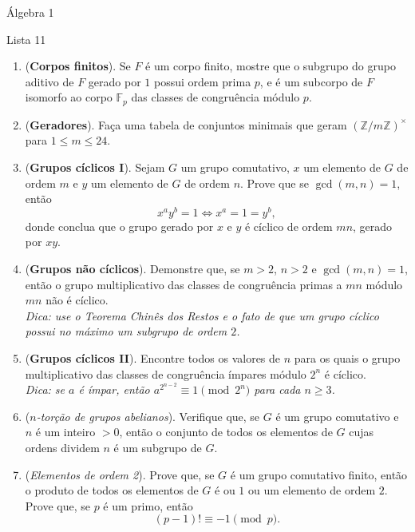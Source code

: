 \documentclass[a4paper,12pt]{article}
\begin{document}
\begin{center}
    \large Álgebra 1
\end{center}

\begin{center}
    \large Lista 11
\end{center}
  
\begin{enumerate}[label=11.\arabic*.]

    \item (\textbf{Corpos finitos}). Se $F$ é um corpo finito, mostre que o subgrupo do grupo aditivo de $F$ gerado por $1$ possui ordem prima $p$, e é um subcorpo de $F$ isomorfo ao corpo $\mathbb{F}_p$ das classes de congruência módulo $p$. 

    \item (\textbf{Geradores}). Faça uma tabela de conjuntos minimais que geram $(\mathbb{Z}/m\mathbb{Z})^\times$ para $1 \leq m \leq 24$. 

    \item (\textbf{Grupos cíclicos I}). Sejam $G$ um grupo comutativo, $x$ um elemento de $G$ de ordem $m$ e $y$ um elemento de $G$ de ordem $n$. Prove que se $\gcd(m,n)=1$, então 
    \[
    x^a y^b = 1 \iff x^a = 1 = y^b,
    \] 
    donde conclua que o grupo gerado por $x$ e $y$ é cíclico de ordem $mn$, gerado por $xy$. 

    \item (\textbf{Grupos não cíclicos}). Demonstre que, se $m > 2$, $n > 2$ e $\gcd(m,n)=1$, então o grupo multiplicativo das classes de congruência primas a $mn$ módulo $mn$ não é cíclico. 
    \\ \textit{Dica: use o Teorema Chinês dos Restos e o fato de que um grupo cíclico possui no máximo um subgrupo de ordem $2$.} 

    \item (\textbf{Grupos cíclicos II}). Encontre todos os valores de $n$ para os quais o grupo multiplicativo das classes de congruência ímpares módulo $2^n$ é cíclico. 
    \\ \textit{Dica: se $a$ é ímpar, então $a^{2^{n-2}} \equiv 1 \pmod{2^n}$ para cada $n \geq 3$.}

    \item (\textit{$n$-torção de grupos abelianos}). Verifique que, se $G$ é um grupo comutativo e $n$ é um inteiro $>0$, então o conjunto de todos os elementos de $G$ cujas ordens dividem $n$ é um subgrupo de $G$. 

    \item (\textit{Elementos de ordem 2}). Prove que, se $G$ é um grupo comutativo finito, então o produto de todos os elementos de $G$ é ou $1$ ou um elemento de ordem $2$. Prove que, se $p$ é um primo, então 
    \[
    (p-1)! \equiv -1 \pmod{p}.
    \]


\end{enumerate}
\end{document}
